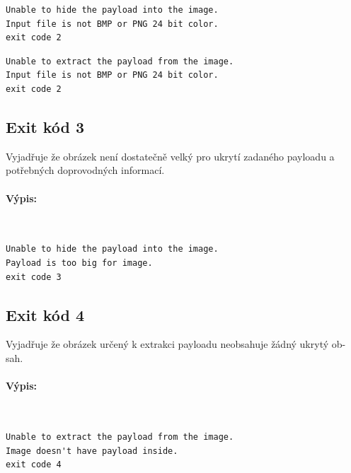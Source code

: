 \documentclass[12pt]{report}
\begin{document}
    \begin{mdframed}
        \begin{verbatim}
Unable to hide the payload into the image.
Input file is not BMP or PNG 24 bit color.
exit code 2
        \end{verbatim}
    \end{mdframed}

    \begin{mdframed}
        \begin{verbatim}
Unable to extract the payload from the image.
Input file is not BMP or PNG 24 bit color.
exit code 2
        \end{verbatim}
    \end{mdframed}

    \subsection{Exit kód 3}
    Vyjadřuje že obrázek není dostatečně velký pro ukrytí zadaného payloadu a
    potřebných doprovodných informací.

    \paragraph{Výpis:}\\

    \begin{mdframed}
        \begin{verbatim}
Unable to hide the payload into the image.
Payload is too big for image.
exit code 3
        \end{verbatim}
    \end{mdframed}

    \subsection{Exit kód 4}
    Vyjadřuje že obrázek určený k extrakci payloadu neobsahuje žádný ukrytý ob-
    sah.\\

    \paragraph{Výpis:}\\

    \begin{mdframed}
        \begin{verbatim}
Unable to extract the payload from the image.
Image doesn't have payload inside.
exit code 4
        \end{verbatim}
    \end{mdframed}
\end{document}
